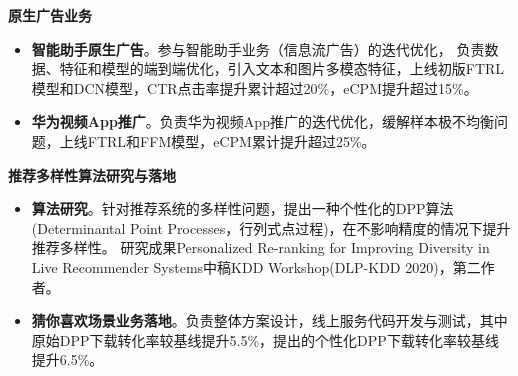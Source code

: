 \documentclass{resume}
\begin{document}
\begin{onehalfspacing}
\textbf{原生广告业务}   
\begin{itemize}%
  \item \textbf{智能助手原生广告}。参与智能助手业务（信息流广告）的迭代优化， 负责数据、特征和模型的端到端优化，引入文本和图片多模态特征，上线初版FTRL模型和DCN模型，CTR点击率提升累计超过20\%，eCPM提升超过15\%。
  \item \textbf{华为视频App推广}。负责华为视频App推广的迭代优化，缓解样本极不均衡问题，上线FTRL和FFM模型，eCPM累计提升超过25\%。
\end{itemize}
\end{onehalfspacing}

\begin{onehalfspacing}
\textbf{推荐多样性算法研究与落地}   
\begin{itemize}%
  \item \textbf{算法研究}。针对推荐系统的多样性问题，提出一种个性化的DPP算法(Determinantal Point Processes，行列式点过程)，在不影响精度的情况下提升推荐多样性。
 研究成果Personalized Re-ranking for Improving Diversity in Live Recommender Systems中稿KDD Workshop(DLP-KDD 2020)，第二作者。
  \item \textbf{猜你喜欢场景业务落地}。负责整体方案设计，线上服务代码开发与测试，其中原始DPP下载转化率较基线提升5.5\%，提出的个性化DPP下载转化率较基线提升6.5\%。
\end{itemize}
\end{onehalfspacing}


\end{document}
